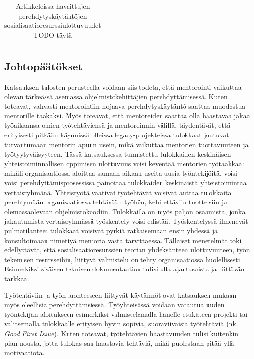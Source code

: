 \documentclass[utf8]{gradu3}
\begin{document}
\begin{table}[h]
\begin{tabular}{llllllllllllllll}
\end{tabular}
\caption{Artikkeleissa havaittujen perehdytyskäytäntöjen sosialisaatioresurssiulottuvuudet TODO täytä}
\label{tbl:ulottuvuusmatriisi}
\end{table}

\subsection{Johtopäätökset}

Katsauksen tulosten perusteella voidaan siis todeta, että mentorointi vaikuttaa olevan tärkeässä asemassa ohjelmistokehittäjien perehdyttämisessä. Kuten \textcite{viviani-murphy-2019} toteavat, vahvasti mentorointiin nojaava perehdytyskäytäntö saattaa muodostua mentorille taakaksi. Myös \textcite{moe-ym-2020} toteavat, että mentoreiden saattaa olla haastavaa jakaa työaikaansa omien työtehtäviensä ja mentoroinnin välillä. \textcite{britto-ym-2017} täydentävät, että erityisesti pitkään käynnissä olleissa legacy-projekteissa tulokkaat joutuvat turvautumaan mentorin apuun usein, mikä vaikuttaa mentorien tuottavuuteen ja työtyytyväisyyteen. Tässä katsauksessa tunnistettu tulokkaiden keskinäisen yhteistoiminnallisen oppimisen ulottuvuus voisi keventää mentorien työtaakkaa: mikäli organisaatiossa aloittaa samaan aikaan useita uusia työntekijöitä, voisi voisi perehdyttämisprosessissa painottaa tulokkaiden keskinäistä yhteistoimintaa vertaisryhmänä. Yhteistyötä vaativat työtehtävät voisivat auttaa tulokkaita perehtymään organisaatiossa tehtävään työhön, kehitettäviin tuotteisiin ja olemassaolevaan ohjelmistokoodiin. Tulokkailla on myös paljon osaamista, jonka jakautumista vertaisryhmässä työskentely voisi edistää. Työskentelyssä ilmenevät pulmatilanteet tulokkaat voisivat pyrkiä ratkaisemaan ensin yhdessä ja konsultoimaan nimettyä mentoria vasta tarvittaessa. Tällaiset menetelmät toki edellyttävät, että sosialisaatioresurssien teorian yhdeksänteen ulottuvuuteen, työn tekemisen resursseihin, liittyvä valmistelu on tehty organisaatiossa huolellisesti. Esimerkiksi sisäisen teknisen dokumentaation tulisi olla ajantasaista ja riittävän tarkkaa.

Työtehtäviin ja työn luonteeseen liittyvät käytännöt ovat katsauksen mukaan myös oleellisia perehdyttämsiessä. Työyhteisössä voidaan varautua uuden työntekijän aloitukseen esimerkiksi valmistelemalla hänelle etukäteen projekti tai valitsemalla tulokkaalle erityisen hyvin sopivia, suoraviivaisia työtehtäviä (nk. \textit{Good First Issue}). Kuten \textcite{ju-ym-2021} toteavat, työtehtävien haastavuuden tulisi kuitenkin pian nousta, jotta tulokas saa haastavia tehtäviä, mikä puolestaan pitää yllä motivaatiota.
\end{document}
